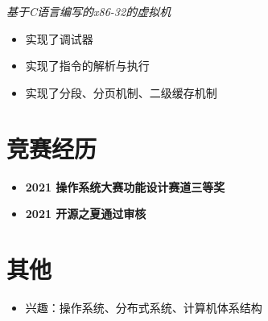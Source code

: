\documentclass{cv}
\begin{document}
{\it 基于C语言编写的x86-32的虚拟机}
\vspace{0.4ex}
\begin{itemize}
  \item 实现了调试器
  \item 实现了指令的解析与执行
  \item 实现了分段、分页机制、二级缓存机制
\end{itemize}

\section{竞赛经历}
\begin{itemize}
  \item \textbf{2021 操作系统大赛功能设计赛道}\quad \textbf{三等奖}
  \item \textbf{2021 开源之夏}\quad \textbf{通过审核}
\end{itemize}

\section{其他}
\begin{itemize}
  \item 兴趣：操作系统、分布式系统、计算机体系结构
\end{itemize}
\end{document}
